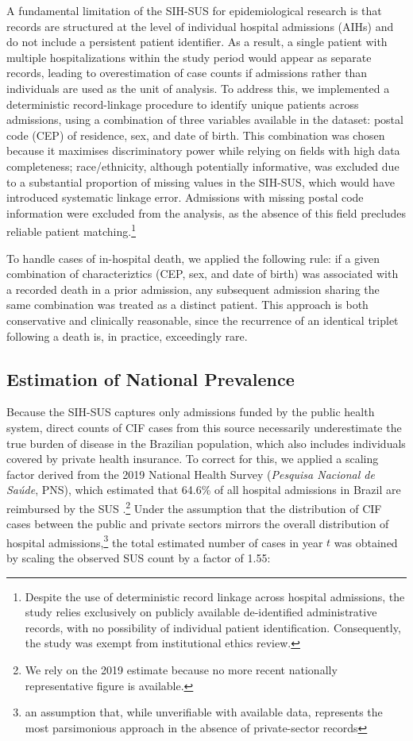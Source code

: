 \documentclass[12pt,a4paper]{article}
\theoremstyle{plain}
\theoremstyle{definition}
\theoremstyle{remark}
\begin{document}
A fundamental limitation of the SIH-SUS for epidemiological research is that records are structured at the level of individual hospital admissions (AIHs) and do not include a persistent patient identifier. As a result, a single patient with multiple hospitalizations within the study period would appear as separate records, leading to overestimation of case counts if admissions rather than individuals are used as the unit of analysis. To address this, we implemented a deterministic record-linkage procedure to identify unique patients across admissions, using a combination of three variables available in the dataset: postal code (CEP) of residence, sex, and date of birth. This combination was chosen because it maximises discriminatory power while relying on fields with high data completeness; race/ethnicity, although potentially informative, was excluded due to a substantial proportion of missing values in the SIH-SUS, which would have introduced systematic linkage error. Admissions with missing postal code information were excluded from the analysis, as the absence of this field precludes reliable patient matching.\footnote{Despite the use of deterministic record linkage across hospital admissions, the study relies exclusively on publicly available de-identified administrative records, with no possibility of individual patient identification. Consequently, the study was exempt from institutional ethics review.}

To handle cases of in-hospital death, we applied the following rule: if a given combination of characteriztics (CEP, sex, and date of birth) was associated with a recorded death in a prior admission, any subsequent admission sharing the same combination was treated as a distinct patient. This approach is both conservative and clinically reasonable, since the recurrence of an identical triplet following a death is, in practice, exceedingly rare.

\subsection*{Estimation of National Prevalence}
Because the SIH-SUS captures only admissions funded by the public health system, direct counts of CIF cases from this source necessarily underestimate the true burden of disease in the Brazilian population, which also includes individuals covered by private health insurance. To correct for this, we applied a scaling factor derived from the 2019 National Health Survey (\textit{Pesquisa Nacional de Sa\'{u}de}, PNS), which estimated that 64.6\% of all hospital admissions in Brazil are reimbursed by the SUS \cite{ibge2020pns}.\footnote{We rely on the 2019 estimate because no more recent nationally representative figure is available.} Under the assumption that the distribution of CIF cases between the public and private sectors mirrors the overall distribution of hospital admissions,\footnote{an assumption that, while unverifiable with available data, represents the most parsimonious approach in the absence of private-sector records} the total estimated number of cases in year $t$ was obtained by scaling the observed SUS count by a factor of 1.55:
\end{document}
